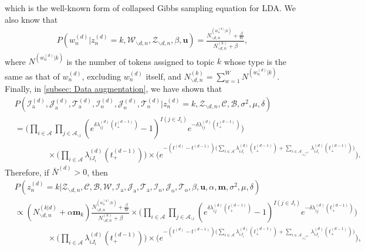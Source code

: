\documentclass[a4paper]{article}
\begin{document}
 which is the well-known form of collapsed Gibbs sampling equation for LDA. We also know that \begin{equation}
 \begin{aligned} 
 P(w^{(d)}_n|z^{(d)}_n=k, \mathcal{W}_{\backslash d, n}, \mathcal{Z}_{\backslash d, n}, \beta, \boldsymbol{u} )=\frac{N^{(w_n^{(d)}|k)}_{\backslash d, n}+\frac{\beta}{W} }{N^{(k)}_{\backslash d, n}+\beta},
 \end{aligned}
 \end{equation}
 where $N^{(w_n^{(d)}|k)}$ is the number of tokens assigned to topic $k$ whose type is the same as that of $w_n^{(d)}$, excluding $w_n^{(d)}$ itself, and $N^{(k)}_{\backslash d, n}=\sum_{w=1}^W N^{(w_n^{(d)}|k)}$. Finally, in \ref{subsec: Data augmentation}, we have shown that
 \begin{equation}
 \begin{aligned}
& P(\mathcal{I}^{(d)}_{\mbox{a}}, \mathcal{J}^{(d)}_{\mbox{a}}, \mathcal{T}^{(d)}_{\mbox{a}}, \mathcal{I}^{(d)}_{\mbox{o}}, \mathcal{J}^{(d)}_{\mbox{o}}, \mathcal{T}^{(d)}_{\mbox{o}}| z^{(d)}_n=k, \mathcal{Z}_{\backslash d, n}, \mathcal{C}, \mathcal{B}, \sigma^2, \mu, \delta)\\&=\Big(\prod_{i\in \mathcal{A}}\prod_{j \in \mathcal{A}_{\backslash i }} (e^{\delta\lambda^{(d)}_{ij}(t_+^{(d-1)})}-1)^{I(j \in J_i)}e^{-\delta\lambda^{(d)}_{ij}(t_+^{(d-1)})}\Big)\\&\quad\quad\quad\quad \times \Big(\prod_{i\in \mathcal{A}} \lambda^{(d)}_{iJ_i}(t_+^{(d-1)})\Big)\times \Big(e^{-(t^{(d)}-t^{(d-1)})\big(\sum\limits_{i \in \mathcal{A}}\lambda^{(d)}_{i{J_i}}(t_+^{(d-1)})+\sum\limits_{i \in \mathcal{A}_{\backslash i_o^{(d)}}}\lambda^{(d)}_{i{J_i}}(t_+^{(d-1)})\big)}\Big).
 \end{aligned}
 \end{equation}
 Therefore, if $\bar N^{(d)} > 0$, then
 \begin{equation}
 \begin{aligned}
  &P(z^{(d)}_n=k|\mathcal{Z}_{\backslash d, n},   \mathcal{C},   \mathcal{B},\mathcal{W}, \mathcal{I}_{\mbox{a}}, \mathcal{J}_{\mbox{a}}, \mathcal{T}_{\mbox{a}}, \mathcal{I}_{\mbox{o}}, \mathcal{J}_{\mbox{o}}, \mathcal{T}_{\mbox{o}}, \beta, \boldsymbol{u}, \alpha, \boldsymbol{m}, \sigma^2, \mu, \delta)\\&\propto (N^{(k|d)}_{\backslash d, n}+\alpha \boldsymbol{m}_k)\frac{N^{(w_n^{(d)}|k)}_{\backslash d, n}+\frac{\beta}{W} }{N^{(k)}_{\backslash d, n}+\beta}\times \Big(\prod_{i\in \mathcal{A}}\prod_{j \in \mathcal{A}_{\backslash i }} (e^{\delta\lambda^{(d)}_{ij}(t_+^{(d-1)})}-1)^{I(j \in J_i)}e^{-\delta\lambda^{(d)}_{ij}(t_+^{(d-1)})}\Big)\\&\quad\quad\quad\quad \times \Big(\prod_{i\in \mathcal{A}} \lambda^{(d)}_{iJ_i}(t_+^{(d-1)})\Big)\times \Big(e^{-(t^{(d)}-t^{(d-1)})\big(\sum\limits_{i \in \mathcal{A}}\lambda^{(d)}_{i{J_i}}(t_+^{(d-1)})+\sum\limits_{i \in \mathcal{A}_{\backslash i_o^{(d)}}}\lambda^{(d)}_{i{J_i}}(t_+^{(d-1)})\big)}\Big), 
 \end{aligned}
 \end{equation}
\end{document}
